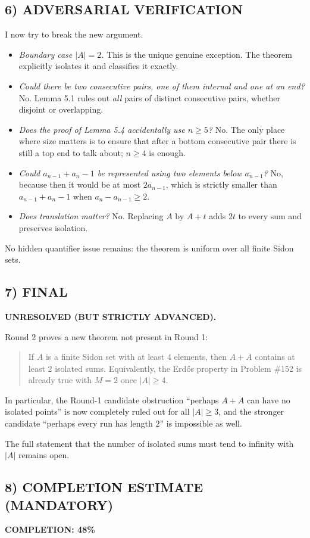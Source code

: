 \subsection*{6) ADVERSARIAL VERIFICATION}
I now try to break the new argument.
\begin{itemize}
\item \emph{Boundary case $|A|=2$.}  This is the unique genuine exception.  The theorem explicitly isolates it and classifies it exactly.
\item \emph{Could there be two consecutive pairs, one of them internal and one at an end?}  No.  Lemma 5.1 rules out \emph{all} pairs of distinct consecutive pairs, whether disjoint or overlapping.
\item \emph{Does the proof of Lemma 5.4 accidentally use $n\ge 5$?}  No.  The only place where size matters is to ensure that after a bottom consecutive pair there is still a top end to talk about; $n\ge 4$ is enough.
\item \emph{Could $a_{n-1}+a_n-1$ be represented using two elements below $a_{n-1}$?}  No, because then it would be at most $2a_{n-1}$, which is strictly smaller than $a_{n-1}+a_n-1$ when $a_n-a_{n-1}\ge 2$.
\item \emph{Does translation matter?}  No.  Replacing $A$ by $A+t$ adds $2t$ to every sum and preserves isolation.
\end{itemize}
No hidden quantifier issue remains: the theorem is uniform over all finite Sidon sets.

\subsection*{7) FINAL}
\textbf{UNRESOLVED (BUT STRICTLY ADVANCED).}

Round 2 proves a new theorem not present in Round 1:
\begin{quote}
If $A$ is a finite Sidon set with at least $4$ elements, then $A+A$ contains at least $2$ isolated sums.  Equivalently, the Erd\H{o}s property in Problem \#152 is already true with $M=2$ once $|A|\ge 4$.
\end{quote}
In particular, the Round-1 candidate obstruction ``perhaps $A+A$ can have no isolated points'' is now completely ruled out for all $|A|\ge 3$, and the stronger candidate ``perhaps every run has length $2$'' is impossible as well.

The full statement that the number of isolated sums must tend to infinity with $|A|$ remains open.

\subsection*{8) COMPLETION ESTIMATE (MANDATORY)}
\textbf{COMPLETION: 48\%}

